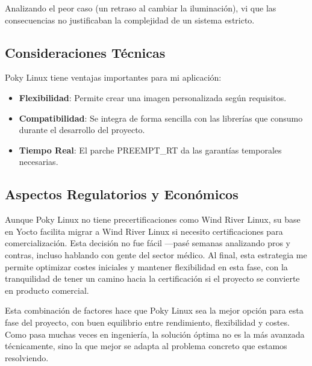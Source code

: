         Analizando el peor caso (un retraso al cambiar la iluminación), vi que las consecuencias no justificaban la complejidad de un sistema estricto.

    \subsection{Consideraciones Técnicas}
        Poky Linux tiene ventajas importantes para mi aplicación:
        \begin{itemize}
            \item \textbf{Flexibilidad}: Permite crear una imagen personalizada según requisitos.
            \item \textbf{Compatibilidad}: Se integra de forma sencilla con las librerías que consumo durante el desarrollo del proyecto.
            \item \textbf{Tiempo Real}: El parche PREEMPT\_RT da las garantías temporales necesarias.
        \end{itemize}

    \subsection{Aspectos Regulatorios y Económicos}
        Aunque Poky Linux no tiene precertificaciones como Wind River Linux, su base en Yocto facilita migrar a Wind River Linux si necesito certificaciones para comercialización. Esta decisión no fue fácil —pasé semanas analizando pros y contras, incluso hablando con gente del sector médico. Al final, esta estrategia me permite optimizar costes iniciales y mantener flexibilidad en esta fase, con la tranquilidad de tener un camino hacia la certificación si el proyecto se convierte en producto comercial.

    Esta combinación de factores hace que Poky Linux sea la mejor opción para esta fase del proyecto, con buen equilibrio entre rendimiento, flexibilidad y costes. Como pasa muchas veces en ingeniería, la solución óptima no es la más avanzada técnicamente, sino la que mejor se adapta al problema concreto que estamos resolviendo.